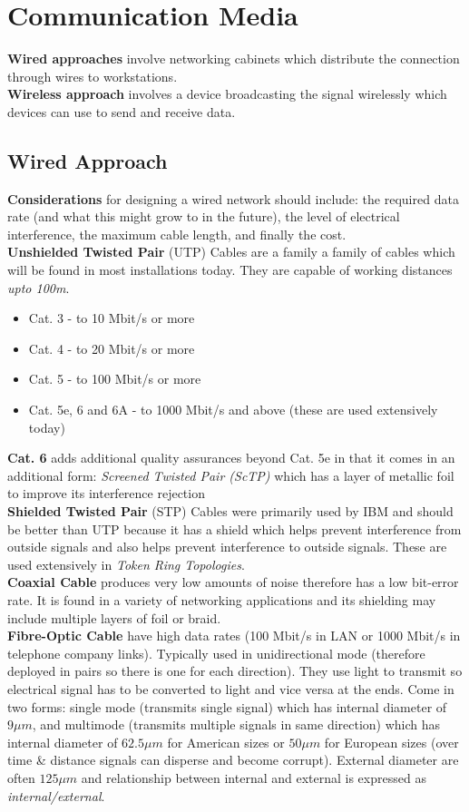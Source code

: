\documentclass[a4paper,11pt]{article}
\begin{document}
\section{Communication Media}
\textbf{Wired approaches} involve networking cabinets which distribute the connection through wires to workstations.\\
\textbf{Wireless approach} involves a device broadcasting the signal wirelessly which devices can use to send and receive data.
\subsection{Wired Approach}
\textbf{Considerations} for designing a wired network should include: the required data rate (and what this might grow to in the future), the level of electrical interference, the maximum cable length, and finally the cost.\\
\textbf{Unshielded Twisted Pair} (UTP) Cables are a family a family of cables which will be found in most installations today. They are capable of working distances \textit{upto 100m}. 
\begin{itemize}
    \item Cat. 3 - to 10 Mbit/s or more
    \item Cat. 4 - to 20 Mbit/s or more
    \item Cat. 5 - to 100 Mbit/s or more
    \item Cat. 5e, 6 and 6A  - to 1000 Mbit/s and above (these are used extensively today)
\end{itemize}
\textbf{Cat. 6} adds additional quality assurances beyond Cat. 5e in that it comes in an additional form: \textit{Screened Twisted Pair (ScTP)} which has a layer of metallic foil to improve its interference rejection\\
\textbf{Shielded Twisted Pair} (STP) Cables were primarily used by IBM and should be better than UTP because it has a shield which helps prevent interference from outside signals and also helps prevent interference to outside signals. These are used extensively in \textit{Token Ring Topologies}. \\
\textbf{Coaxial Cable} produces very low amounts of noise therefore has a low bit-error rate. It is found in a variety of networking applications and its shielding may include multiple layers of foil or braid.\\
\textbf{Fibre-Optic Cable} have high data rates (100 Mbit/s in LAN or 1000 Mbit/s in telephone company links). Typically used in unidirectional mode (therefore deployed in pairs so there is one for each direction). They use light to transmit so electrical signal has to be converted to light and vice versa at the ends. Come in two forms: single mode (transmits single signal) which has internal diameter of $9\mu m$, and multimode (transmits multiple signals in same direction) which has internal diameter of $62.5\mu m$ for American sizes or $50\mu m$ for European sizes (over time \& distance signals can disperse and become corrupt). External diameter are often $125\mu m$ and relationship between internal and external is expressed as \textit{internal/external}.
\end{document}
